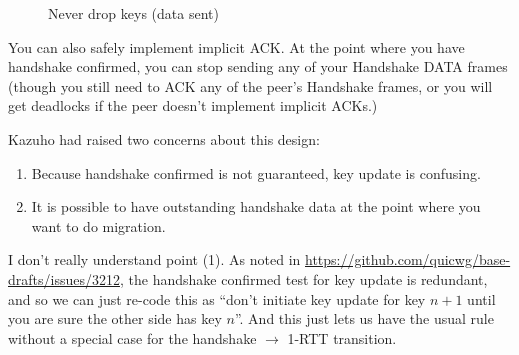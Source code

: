 \documentclass{article}
\begin{document}
\begin{figure}[H]
\begin{center}
\end{center}
\caption{Never drop keys (data sent)}
\label{fig:never-drop-2}
\end{figure}

You can also safely implement implicit ACK. At the point
where you have handshake confirmed, you can stop sending
any of your Handshake DATA frames (though you still
need to ACK any of the peer's Handshake frames, or you
will get deadlocks if the peer doesn't implement implicit
ACKs.)

Kazuho had raised two concerns about this design:

\begin{enumerate}
\item Because handshake confirmed is not guaranteed, key update
  is confusing.
\item It is possible to have outstanding handshake data at the
  point where you want to do migration.
\end{enumerate}

I don't really understand point (1). As noted in
\url{https://github.com/quicwg/base-drafts/issues/3212}, the handshake
confirmed test for key update is redundant, and so we can just re-code
this as ``don't initiate key update for key $n+1$ until you are sure
the other side has key $n$''. And this just lets us have the usual
rule without a special case for the handshake $\rightarrow$ 1-RTT
transition.
\end{document}
